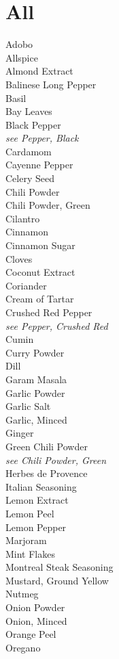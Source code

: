 \documentclass[twocolumn]{article}
\newcommand{\cf}[2]{#1\\\indent\emph{see #2}}
\begin{document}
\section*{All}
Adobo\\
Allspice\\
Almond Extract\\
Balinese Long Pepper\\
Basil\\
Bay Leaves\\
\cf{Black Pepper}{Pepper, Black}\\
Cardamom\\
Cayenne Pepper\\
Celery Seed\\
Chili Powder\\
Chili Powder, Green\\
Cilantro\\
Cinnamon\\
Cinnamon Sugar\\
Cloves\\
Coconut Extract\\
Coriander\\
Cream of Tartar\\
\cf{Crushed Red Pepper}{Pepper, Crushed Red}\\
Cumin\\
Curry Powder\\
Dill\\
Garam Masala\\
Garlic Powder\\
Garlic Salt\\
Garlic, Minced\\
Ginger\\
\cf{Green Chili Powder}{Chili Powder, Green}\\
Herbes de Provence\\
Italian Seasoning\\
Lemon Extract\\
Lemon Peel\\
Lemon Pepper\\
Marjoram\\
Mint Flakes\\
Montreal Steak Seasoning\\
Mustard, Ground Yellow\\
Nutmeg\\
Onion Powder\\
Onion, Minced\\
Orange Peel\\
Oregano\\
\end{document}
